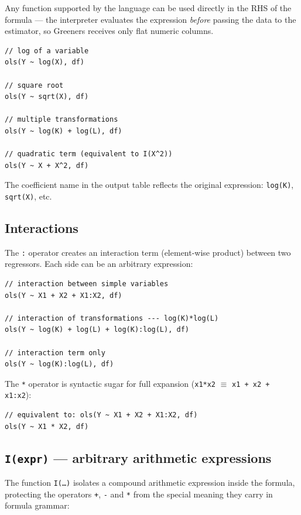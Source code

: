Any function supported by the language can be used directly in the RHS
of the formula --- the interpreter evaluates the expression \emph{before}
passing the data to the estimator, so Greeners receives only flat numeric
columns.

\begin{lstlisting}[caption={Transformed regressors}]
// log of a variable
ols(Y ~ log(X), df)

// square root
ols(Y ~ sqrt(X), df)

// multiple transformations
ols(Y ~ log(K) + log(L), df)

// quadratic term (equivalent to I(X^2))
ols(Y ~ X + X^2, df)
\end{lstlisting}

The coefficient name in the output table reflects the original expression:
\texttt{log(K)}, \texttt{sqrt(X)}, etc.

\subsection{Interactions}
\label{subsec:formula-interactions}

The \texttt{:} operator creates an interaction term (element-wise product)
between two regressors. Each side can be an arbitrary expression:

\begin{lstlisting}[caption={Interactions}]
// interaction between simple variables
ols(Y ~ X1 + X2 + X1:X2, df)

// interaction of transformations --- log(K)*log(L)
ols(Y ~ log(K) + log(L) + log(K):log(L), df)

// interaction term only
ols(Y ~ log(K):log(L), df)
\end{lstlisting}

The \texttt{*} operator is syntactic sugar for full expansion
(\texttt{x1*x2} $\equiv$ \texttt{x1 + x2 + x1:x2}):

\begin{lstlisting}
// equivalent to: ols(Y ~ X1 + X2 + X1:X2, df)
ols(Y ~ X1 * X2, df)
\end{lstlisting}

\subsection{\texttt{I(expr)} --- arbitrary arithmetic expressions}
\label{subsec:formula-I}

The function \texttt{I(\ldots)} isolates a compound arithmetic expression
inside the formula, protecting the operators \texttt{+}, \texttt{-} and
\texttt{*} from the special meaning they carry in formula grammar:


